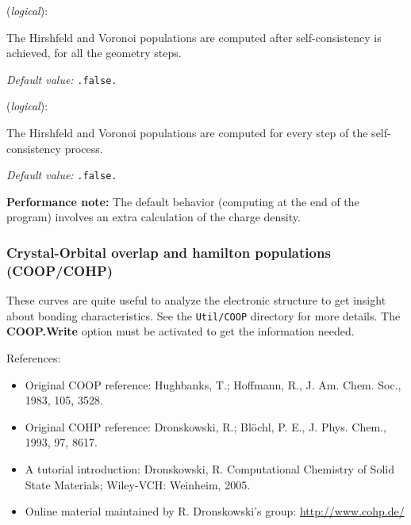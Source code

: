 \documentclass[11pt]{article}
\begin{document}
\begin{description}
\itemsep 10pt
\parsep 0pt

\item[{\bf PartialChargesAtEveryGeometry}] ({\it logical}):

The Hirshfeld and Voronoi populations are computed after
self-consistency is achieved, for all the geometry steps.

{\it Default value:} {\tt .false.}

\item[{\bf PartialChargesAtEveryScfStep}] ({\it logical}):

The Hirshfeld and Voronoi populations are computed for every
step of the self-consistency process.

{\it Default value:} {\tt .false.}

\end{description}

{\bf Performance note:}
The default behavior (computing at the end of the program) involves
an extra calculation of the charge density.
%


\subsubsection{Crystal-Orbital overlap and hamilton populations (COOP/COHP)}
\label{sec:coop}

These curves are quite useful to analyze the electronic structure to
get insight about bonding characteristics. See the {\tt Util/COOP}
directory for more details. The {\bf COOP.Write} option must be
activated to get the information needed.

References:

\begin{itemize}
\item Original COOP reference:
Hughbanks, T.; Hoffmann, R., J. Am. Chem. Soc., 1983, 105, 3528.
\item Original COHP reference: Dronskowski, R.; Blöchl, P. E., J. Phys. Chem., 1993, 97, 8617.
\item A tutorial introduction: Dronskowski, R. Computational Chemistry of Solid State
Materials; Wiley-VCH: Weinheim, 2005.
\item Online material maintained by R. Dronskowski's group: \url{http://www.cohp.de/}
\end{itemize}
\end{document}
